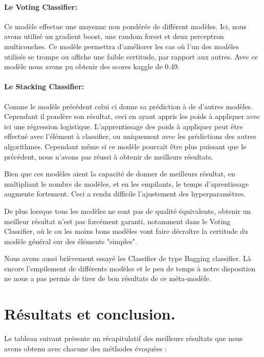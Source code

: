 \documentclass[twocolumn,10pt]{article}
\begin{document}
        \paragraph{Le Voting Classifier:} Ce modèle effectue une moyenne non pondérée de différent modèles. Ici, nous avons utilisé un gradient boost, une random forest et deux perceptron multicouches. Ce modèle permettra d'améliorer les cas où l'un des modèles utilisés se trompe ou affiche une faible certitude, par rapport aux autres. 
        Avec ce modèle nous avons pu obtenir des scores kaggle de 0.49.
        
        \paragraph{Le Stacking Classifier:} Comme le modèle précédent celui ci donne sa prédiction à de d'autres modèles. Cependant il pondère son résultat, ceci en ayant appris les poids à appliquer avec ici une régression logistique. L'apprentissage des poids à appliquer peut être effectué avec l'élément à classifier, ou uniquement avec les prédictions des autres algorithmes. Cependant même si ce modèle pourrait être plus puissant que le précédent, nous n'avons pas réussi à obtenir de meilleurs résultats.

        Bien que ces modèles aient la capacité de donner de meilleurs résultat, en multipliant le nombre de modèles, et en les empilants, le temps d'aprentissage augmente fortement. Ceci a rendu difficile l'ajustement des hyperparamètres.
        
        De plus lorsque tous les modèles ne sont pas de qualité équivalente, obtenir un meilleur résultat n'est pas forcément garanti, notamment dans le Voting Classifier, où le ou les moins bons modèles vont faire décroître la certitude du modèle général sur des éléments "simples".
        
        Nous avons aussi brièvement essayé les Classifier de type Bagging classifier. Là encore l'empilement de différents modèles et le peu de temps à notre disposition ne nous a pas permis de tirer de bon résultats de ce méta-modèle.
        
       
        
\section{Résultats et conclusion.}
    Le tableau suivant présente un récapitulatif des meilleurs résultats que nous avons obtenu avec chacune des méthodes évoquées :
    \\
    
\end{document}
